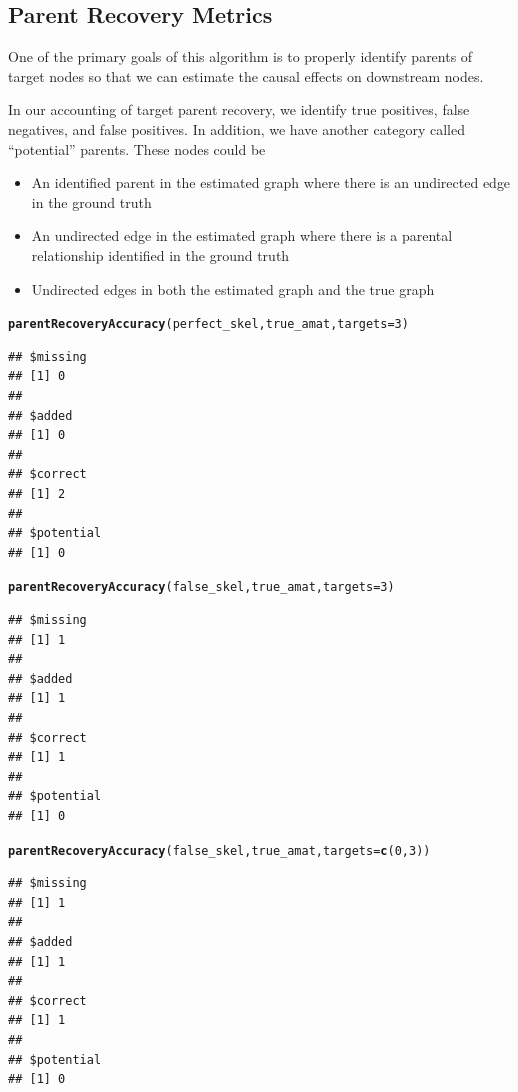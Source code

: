 \documentclass[12pt]{article}\usepackage[]{graphicx}\usepackage[]{color}
\makeatletter
\newcommand{\hlnum}[1]{\textcolor[rgb]{0.686,0.059,0.569}{#1}}%
\newcommand{\hlstd}[1]{\textcolor[rgb]{0.345,0.345,0.345}{#1}}%
\newcommand{\hlkwc}[1]{\textcolor[rgb]{0.333,0.667,0.333}{#1}}%
\newcommand{\hlkwd}[1]{\textcolor[rgb]{0.737,0.353,0.396}{\textbf{#1}}}%
\newenvironment{kframe}{%
 \def\at@end@of@kframe{}%
 \ifinner\ifhmode%
  \def\at@end@of@kframe{\end{minipage}}%
  \begin{minipage}{\columnwidth}%
 \fi\fi%
 \def\FrameCommand##1{\hskip\@totalleftmargin \hskip-\fboxsep
 \colorbox{shadecolor}{##1}\hskip-\fboxsep
     \hskip-\linewidth \hskip-\@totalleftmargin \hskip\columnwidth}%
 \MakeFramed {\advance\hsize-\width
   \@totalleftmargin\z@ \linewidth\hsize
   \@setminipage}}%
 {\par\unskip\endMakeFramed%
 \at@end@of@kframe}
\newenvironment{knitrout}{}{} %
\makeatother
\begin{document}
\subsection*{Parent Recovery Metrics}
One of the primary goals of this algorithm is to properly identify parents of target nodes so that we can estimate the causal effects on downstream nodes.

In our accounting of target parent recovery, we identify true positives, false negatives, and false positives. In addition, we have another category called ``potential'' parents. These nodes could be 
\begin{itemize}
\item An identified parent in the estimated graph where there is an undirected edge in the ground truth
\item An undirected edge in the estimated graph where there is a parental relationship identified in the ground truth
\item Undirected edges in both the estimated graph and the true graph
\end{itemize}

\begin{knitrout}
\color{fgcolor}\begin{kframe}
\begin{alltt}
\hlkwd{parentRecoveryAccuracy}\hlstd{(perfect_skel,true_amat,}\hlkwc{targets} \hlstd{=} \hlnum{3}\hlstd{)}
\end{alltt}
\begin{verbatim}
## $missing
## [1] 0
## 
## $added
## [1] 0
## 
## $correct
## [1] 2
## 
## $potential
## [1] 0
\end{verbatim}
\begin{alltt}
\hlkwd{parentRecoveryAccuracy}\hlstd{(false_skel,true_amat,}\hlkwc{targets} \hlstd{=} \hlnum{3}\hlstd{)}
\end{alltt}
\begin{verbatim}
## $missing
## [1] 1
## 
## $added
## [1] 1
## 
## $correct
## [1] 1
## 
## $potential
## [1] 0
\end{verbatim}
\begin{alltt}
\hlkwd{parentRecoveryAccuracy}\hlstd{(false_skel,true_amat,}\hlkwc{targets} \hlstd{=} \hlkwd{c}\hlstd{(}\hlnum{0}\hlstd{,}\hlnum{3}\hlstd{))}
\end{alltt}
\begin{verbatim}
## $missing
## [1] 1
## 
## $added
## [1] 1
## 
## $correct
## [1] 1
## 
## $potential
## [1] 0
\end{verbatim}
\end{kframe}
\end{knitrout}
\end{document}
